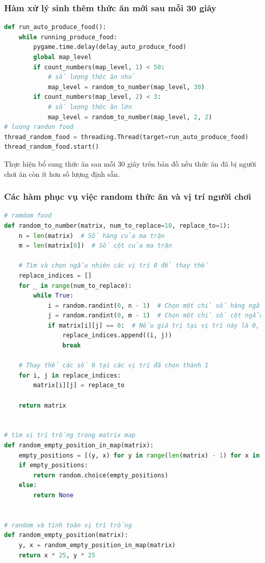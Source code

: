 \documentclass[a4paper]{article}
\begin{document}
\subsubsection{Hàm xử lý sinh thêm thức ăn mới sau mỗi 30 giây}
\begin{lstlisting}[language=Python]
def run_auto_produce_food():
    while running_produce_food:
        pygame.time.delay(delay_auto_produce_food)
        global map_level
        if count_numbers(map_level, 1) < 50:
            # số lượng thức ăn nhỏ
            map_level = random_to_number(map_level, 30)
        if count_numbers(map_level, 2) < 3:
            # số lượng thức ăn lớn
            map_level = random_to_number(map_level, 2, 2)
# luong randon food
thread_random_food = threading.Thread(target=run_auto_produce_food)
thread_random_food.start()
\end{lstlisting}
Thực hiện bổ sung thức ăn sau mỗi 30 giây trên bản đồ nếu thức ăn đã bị người chơi ăn còn ít hơn số lượng định sẵn.


\subsubsection{Các hàm phục vụ việc random thức ăn và vị trí người chơi}
\begin{lstlisting}[language=Python]
# ramdom food
def random_to_number(matrix, num_to_replace=10, replace_to=1):
    n = len(matrix)  # Số hàng của ma trận
    m = len(matrix[0])  # Số cột của ma trận

    # Tìm và chọn ngẫu nhiên các vị trí 0 để thay thế
    replace_indices = []
    for _ in range(num_to_replace):
        while True:
            i = random.randint(0, n - 1)  # Chọn một chỉ số hàng ngẫu nhiên
            j = random.randint(0, m - 1)  # Chọn một chỉ số cột ngẫu nhiên
            if matrix[i][j] == 0:  # Nếu giá trị tại vị trí này là 0, thì thêm vào danh sách và thoát vòng lặp
                replace_indices.append((i, j))
                break

    # Thay thế các số 0 tại các vị trí đã chọn thành 1
    for i, j in replace_indices:
        matrix[i][j] = replace_to

    return matrix


# tìm vị trí trống trong matrix map
def random_empty_position_in_map(matrix):
    empty_positions = [(y, x) for y in range(len(matrix) - 1) for x in range(len(matrix[0]) - 1) if matrix[y][x] == 0]
    if empty_positions:
        return random.choice(empty_positions)
    else:
        return None


# random và tính toán vị trí trống
def random_empty_position(matrix):
    y, x = random_empty_position_in_map(matrix)
    return x * 25, y * 25

\end{lstlisting}
\end{document}
